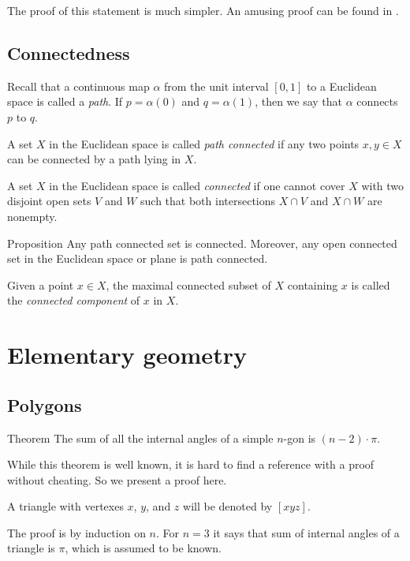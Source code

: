The proof of this statement is much simpler.
An amusing proof can be found in \cite{chambers-liokumovich}.

\subsection*{Connectedness}

Recall that a continuous map $\alpha$ from the unit interval $[0,1]$ to a Euclidean space is called a \emph{path}.
If $p=\alpha (0)$ and $q = \alpha (1)$, then we say that $\alpha$ connects $p$ to $q$.


A set $X$ in the Euclidean space is called \emph{path connected} if any two points $x,y\in X$ can be connected by a path lying in $X$.

A set $X$ in the Euclidean space is called \emph{connected} if one cannot cover $X$ with two disjoint open sets $V$ and $W$ such that both intersections $X\cap V$ and $X\cap W$ are nonempty.

\begin{thm}{Proposition}
Any path connected set is connected.
Moreover, any open connected set in the Euclidean space or  plane is path connected.
\end{thm}

Given a point $x\in X$, the maximal connected subset of $X$ containing $x$ is called the \emph{connected component} of $x$ in $X$.



\section{Elementary geometry}

\subsection*{Polygons}

\begin{thm}{Theorem}\label{thm:sum=(n-2)pi}
The sum of all the internal angles of a simple $n$-gon is $(n-2)\cdot\pi$. 
\end{thm}

While this theorem is well known, it is hard to find a reference with a proof without cheating.
So we present a proof here.

A triangle with vertexes $x$, $y$, and $z$ will be denoted by $[xyz]$.

The proof is by induction on $n$.
For $n=3$ it says that sum of internal angles of a triangle is $\pi$, which is assumed to be known.

